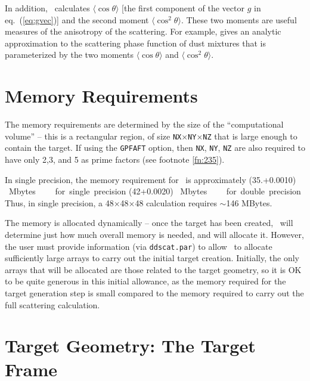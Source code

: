 In addition, \ddscat\ calculates $\langle\cos\theta\rangle$ [the first
component of the vector $g$ in eq.\ (\ref{eq:gvec})] and the
second moment $\langle\cos^2\theta\rangle$.
These two moments are useful measures of the anisotropy of the scattering.
For example, \citet{Draine_2003b} gives an analytic approximation to the
scattering phase function of dust mixtures that is parameterized by
the two moments
$\langle\cos\theta\rangle$ and $\langle\cos^2\theta\rangle$.

\section{Memory Requirements \label{sec:memory_requirements}}

The memory requirements are determined by the size of the ``computational
volume'' -- this is a rectangular region, of size 
{\tt NX}$\times${\tt NY}$\times${\tt NZ} that is large enough to contain
the target.  If using the {\tt GPFAFT} option, then {\tt NX},
{\tt NY}, {\tt NZ} are also required to have only 2,3, and 5 as prime factors
(see footnote \ref{fn:235}).

In single precision, the memory requirement for \ddscatv\ is approximately 
\beq
(35.+0.0010) {\rm ~Mbytes}  
~~~~{\rm for~single~precision}
\eeq
\beq
(42+0.0020) {\rm ~Mbytes}
~~~~{\rm for~double~precision}
\eeq
Thus, in single precision, a
48$\times$48$\times$48 calculation requires $\sim$146 MBytes.

The memory is allocated dynamically -- once the target has been created,
\ddscatv\ will determine just how much overall memory is needed, and
will allocate it.  However, the user must provide information (via 
{\tt ddscat.par}) to allow \ddscatv\ to allocate sufficiently large arrays
to carry out the initial target creation.  Initially, the only arrays that
will be allocated are those related to the target geometry, so it is
OK to be quite generous in this initial allowance, as the memory
required for the target generation step is small compared to the
memory required to carry out the full scattering calculation.

\section{Target Geometry: The Target Frame
         \label{sec:target geometry}}

